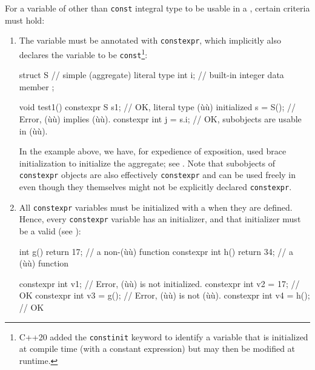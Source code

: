 For a variable of other than \lstinline!const! integral type to be usable
in a , certain criteria must hold:

\begin{enumerate}
\item{The variable must be annotated with \lstinline!constexpr!, which implicitly also declares the variable to be \lstinline!const!\footnote{C++20 added the \lstinline!constinit! keyword to identify a variable that is initialized at compile time (with a constant expression) but may then be modified at runtime.}:

\begin{emcppslisting}
struct S  // simple (aggregate) literal type
{
    int i;  // built-in integer data member
};

void test1()
{
    constexpr S s{1};       // OK, literal type (ù{}ù) initialized
    s = S();                // Error, (ù{}ù) implies (ù{}ù).
    constexpr int j = s.i;  // OK, subobjects are usable in (ù{}ù).
}
\end{emcppslisting}
    
\noindent In the example above, we have, for expedience of exposition, used brace
initialization to initialize the aggregate; see . Note that subobjects of \lstinline!constexpr! objects
are also effectively \lstinline!constexpr! and can be used freely in
 even though they themselves might not be
explicitly declared \lstinline!constexpr!.}

\item{All \lstinline!constexpr! variables must be initialized with a  when they are defined. Hence, every \lstinline!constexpr! variable has an initializer, and that initializer must be a valid  (see ):

\begin{emcppslisting}
          int g() { return 17; }  // a non-(ù{}ù) function
constexpr int h() { return 34; }  // a (ù{}ù) function

constexpr int v1;        // Error, (ù{}ù) is not initialized.
constexpr int v2 = 17;   // OK
constexpr int v3 = g();  // Error, (ù{}ù) is not (ù{}ù).
constexpr int v4 = h();  // OK


\end{emcppslisting}}
\end{enumerate}
